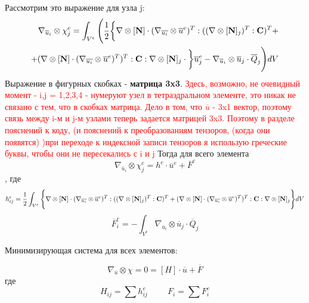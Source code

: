 \documentclass[a4paper,12pt]{article}
\begin{document}
Рассмотрим это выражение для узла j:
\begin{equation}
    \begin{split}
        \nabla_{\overline{u}_i} \otimes \chi^e_j = \int_{V^e} \Bigg(\frac{1}{2}\bigg\{ \nabla \otimes [\textbf{N}] \cdot (\nabla_{\overline{u_i}} \otimes \overline{u}^e)^T:((\nabla \otimes[\textbf{N}]_j)^T:\textbf{C})^T + \\ 
        +(\nabla \otimes [\textbf{N}] \cdot (\nabla_{\overline{u_i}} \otimes \overline{u}^e)^T)^T:\textbf{C}:\nabla \otimes [\textbf{N}]_j \cdot \bigg\} \overline{u}^e_j  - \nabla_{\overline{u}_i} \otimes\overline{u}_j \cdot \overline{Q}_j \Bigg)\space dV
    \end{split}
\end{equation}
Выражение в фигурных скобках - \textbf{матрица 3x3}. \textcolor{red}{Здесь, возможно, не очевидный момент - i,j = {1,2,3,4} - нумеруют узел в тетраэдральном элементе, это никак не связано с тем, что в скобках матрица. Дело в том, что $\overline{u}$ - 3x1 вектор, поэтому связь между i-м и j-м узлами теперь задается матрицей 3x3. Поэтому в разделе пояснений к коду, (и пояснений к преобразованиям тензоров, (когда они появятся) )при переходе к индексной записи тензоров я использую греческие буквы, чтобы они не пересекались с i и j}
Тогда для всего элемента
\begin{equation}
    \nabla_{\overline{u}_i} \otimes \chi^e_j = h^e \cdot \overline{u}^e + \overline{F}^e
\end{equation},
где
\begin{equation}
    h_{ij}^e = \frac{1}{2}\int_{V^e} \Bigg\{ \nabla \otimes [\textbf{N}] \cdot (\nabla_{\overline{u_i}} \otimes \overline{u}^e)^T:((\nabla \otimes[\textbf{N}]_j)^T:\textbf{C})^T + \\ 
        (\nabla \otimes [\textbf{N}] \cdot (\nabla_{\overline{u_i}} \otimes \overline{u}^e)^T)^T:\textbf{C}:\nabla \otimes [\textbf{N}]_j \Bigg\} dV
\end{equation}
\begin{equation}
    \overline{F}^e_i = - \int_{V^e}\nabla_{\overline{u}_i} \otimes\overline{u}_j \cdot \overline{Q}_j
\end{equation}

Минимизирующая система для всех элементов:

\begin{equation}
    \nabla_{\overline{u}} \otimes \chi = 0 =[H] \cdot \overline{u} +  \overline{F}
\end{equation}
где 
\begin{equation}
    H_{ij} = \sum h_{ij}^e  \hspace{1cm} F_i = \sum F_i^e
\end{equation}
\end{document}
